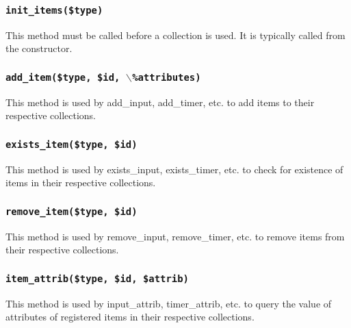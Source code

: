 \documentclass[12pt,a4paper]{article}
\begin{document}
\subsubsection*{\texttt{init\_items(\$type)}\label{xPL::Base_init_items_type_}}


This method must be called before a collection is used.  It
is typically called from the constructor.

\subsubsection*{\texttt{add\_item(\$type, \$id, $\backslash$\%attributes)}\label{xPL::Base_add_item_type_id_backslash_attributes_}}


This method is used by \textsf{add\_input}, \textsf{add\_timer}, etc. to add
items to their respective collections.

\subsubsection*{\texttt{exists\_item(\$type, \$id)}\label{xPL::Base_exists_item_type_id_}}


This method is used by \textsf{exists\_input}, \textsf{exists\_timer}, etc. to check
for existence of items in their respective collections.

\subsubsection*{\texttt{remove\_item(\$type, \$id)}\label{xPL::Base_remove_item_type_id_}}


This method is used by \textsf{remove\_input}, \textsf{remove\_timer}, etc. to remove
items from their respective collections.

\subsubsection*{\texttt{item\_attrib(\$type, \$id, \$attrib)}\label{xPL::Base_item_attrib_type_id_attrib_}}


This method is used by \textsf{input\_attrib}, \textsf{timer\_attrib}, etc. to query
the value of attributes of registered items in their respective
collections.
\end{document}
